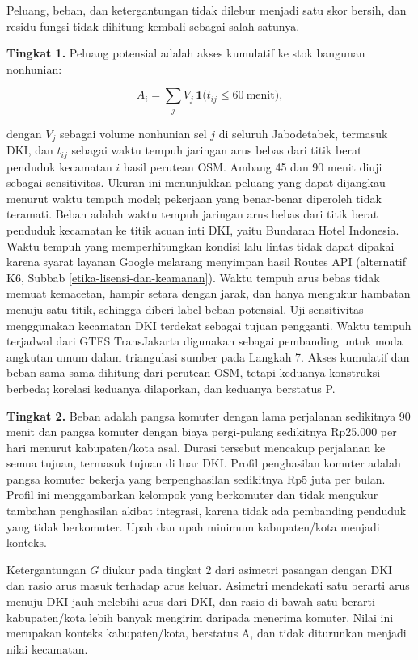 \documentclass[12pt,a4paper,oneside,openany,indonesian]{report}
\begin{document}
Peluang, beban, dan ketergantungan tidak dilebur menjadi satu skor
bersih, dan residu fungsi tidak dihitung kembali sebagai salah satunya.

\textbf{Tingkat 1.} Peluang potensial adalah akses kumulatif ke stok
bangunan nonhunian:

\[
A_i = \sum_{j} V_j \,\mathbf{1}\bigl(t_{ij} \leq 60\ \text{menit}\bigr),
\]

\noindent dengan $V_j$ sebagai volume nonhunian sel $j$ di seluruh
Jabodetabek, termasuk DKI, dan $t_{ij}$ sebagai waktu tempuh jaringan
arus bebas dari titik berat penduduk kecamatan $i$ hasil perutean OSM.
Ambang 45 dan 90 menit diuji sebagai sensitivitas. Ukuran ini menunjukkan
peluang yang dapat dijangkau menurut waktu tempuh model; pekerjaan yang
benar-benar diperoleh tidak teramati. Beban adalah waktu tempuh jaringan arus bebas dari titik
berat penduduk kecamatan ke titik acuan inti DKI, yaitu Bundaran Hotel
Indonesia. Waktu tempuh yang memperhitungkan kondisi lalu lintas tidak
dapat dipakai karena syarat layanan Google melarang menyimpan hasil Routes API (alternatif K6,
Subbab \ref{etika-lisensi-dan-keamanan}). Waktu tempuh arus bebas tidak
memuat kemacetan, hampir setara dengan jarak, dan hanya mengukur
hambatan menuju satu titik, sehingga diberi label beban potensial.
Uji sensitivitas menggunakan kecamatan DKI terdekat sebagai tujuan
pengganti. Waktu tempuh terjadwal dari GTFS TransJakarta digunakan
sebagai pembanding untuk moda angkutan umum dalam triangulasi sumber
pada Langkah 7. Akses kumulatif dan beban sama-sama dihitung dari perutean OSM,
tetapi keduanya konstruksi berbeda; korelasi keduanya dilaporkan, dan
keduanya berstatus P.

\textbf{Tingkat 2.} Beban adalah pangsa komuter dengan lama perjalanan
sedikitnya 90 menit dan pangsa komuter dengan biaya pergi-pulang
sedikitnya Rp25.000 per hari menurut kabupaten/kota asal. Durasi tersebut mencakup perjalanan ke semua tujuan, termasuk tujuan di luar DKI. Profil
penghasilan komuter adalah pangsa komuter bekerja yang berpenghasilan
sedikitnya Rp5 juta per bulan. Profil ini menggambarkan kelompok yang
berkomuter dan tidak mengukur tambahan penghasilan akibat integrasi,
karena tidak ada pembanding penduduk yang tidak berkomuter. Upah dan
upah minimum kabupaten/kota menjadi konteks.

Ketergantungan $G$ diukur pada tingkat 2 dari asimetri pasangan dengan
DKI dan rasio arus masuk terhadap arus keluar. Asimetri mendekati satu
berarti arus menuju DKI jauh melebihi arus dari DKI, dan rasio di bawah
satu berarti kabupaten/kota lebih banyak mengirim daripada menerima
komuter. Nilai ini merupakan konteks kabupaten/kota, berstatus A, dan
tidak diturunkan menjadi nilai kecamatan.
\end{document}
